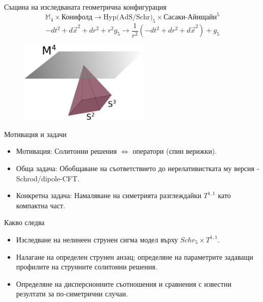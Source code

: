 \documentclass[bulg]{beamer}
\begin{document}
  \begin{frame}
    \vspace{-1em}
    \begin{alertblock}{Същина на изследваната геометрична конфигурация}
    \begin{equation*}
        \mathds{M}_4 \times \text{Конифолд} \rightarrow \text{Hyp(AdS/Schr)}_5
      \times \text{Сасаки-Айнщайн}^5 
    \end{equation*}
\begin{equation*}
  -dt^2 +d\vec{x}^2 + dr^2+r^2g_5 \rightarrow \frac{1}{r^2}(-dt^2 + dr^2
  + d\vec{x}^2) + g_5
\end{equation*}

    \begin{figure}
      \includegraphics[width=0.55\textwidth]{images/ads4x6.png}
    \end{figure}
  \end{alertblock}
  \end{frame}
  \begin{frame}
    \begin{alertblock}{Мотивация и задачи}
    \begin{itemize}
      \item \alert{Мотивация:}  Солитонни решения $\iff$ оператори (спин верижки).
      \item \alert{Обща задача:} Обобщаване на съответствието до нерелативистката му версия
        - Schrod/dipole-CFT.
      \item \alert{Конкретна задача:} Намаляване на симетрията разглеждайки
        $T^{1,1}$ като компактна част.
    \end{itemize}
  \end{alertblock}
  \begin{alertblock}{Какво следва}
    \begin{itemize}
      \item Изследване на нелинеен струнен сигма модел върху $Schr_5\times
        T^{1,1}$.
      \item Налагане на определен струнен анзац; определяне на параметрите
        задаващи профилите на струнните солитонни решения.
      \item Определяне на дисперсионните съотношения и сравнения с известни
        резултати за по-симетрични случаи.
    \end{itemize}
  \end{alertblock}
  \end{frame}
\end{document}
